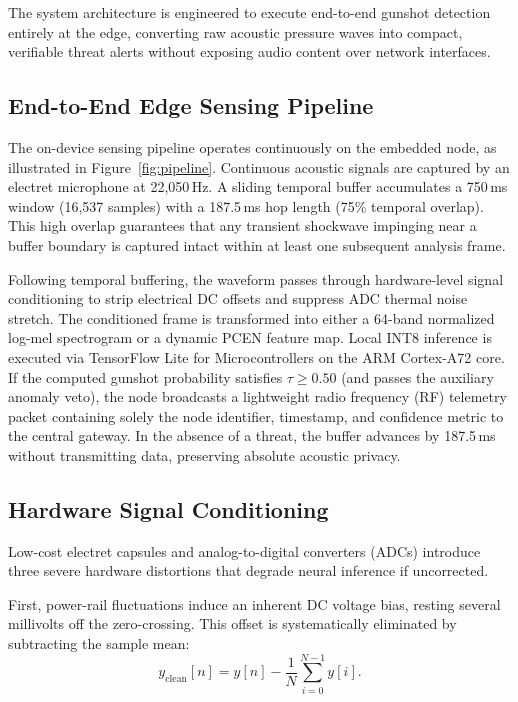 \documentclass[conference]{IEEEtran}
\begin{document}
The system architecture is engineered to execute end-to-end gunshot detection entirely at the edge, converting raw acoustic pressure waves into compact, verifiable threat alerts without exposing audio content over network interfaces.

\subsection{End-to-End Edge Sensing Pipeline}
\label{subsec:edge_pipeline}

The on-device sensing pipeline operates continuously on the embedded node, as illustrated in Figure~\ref{fig:pipeline}. Continuous acoustic signals are captured by an electret microphone at 22{,}050\,Hz. A sliding temporal buffer accumulates a 750\,ms window (16{,}537 samples) with a 187.5\,ms hop length (75\% temporal overlap). This high overlap guarantees that any transient shockwave impinging near a buffer boundary is captured intact within at least one subsequent analysis frame.

Following temporal buffering, the waveform passes through hardware-level signal conditioning to strip electrical DC offsets and suppress ADC thermal noise stretch. The conditioned frame is transformed into either a 64-band normalized log-mel spectrogram or a dynamic PCEN feature map. Local INT8 inference is executed via TensorFlow Lite for Microcontrollers on the ARM Cortex-A72 core. If the computed gunshot probability satisfies $\tau \ge 0.50$ (and passes the auxiliary anomaly veto), the node broadcasts a lightweight radio frequency (RF) telemetry packet containing solely the node identifier, timestamp, and confidence metric to the central gateway. In the absence of a threat, the buffer advances by 187.5\,ms without transmitting data, preserving absolute acoustic privacy.

\subsection{Hardware Signal Conditioning}
\label{subsec:conditioning}

Low-cost electret capsules and analog-to-digital converters (ADCs) introduce three severe hardware distortions that degrade neural inference if uncorrected.

First, power-rail fluctuations induce an inherent DC voltage bias, resting several millivolts off the zero-crossing. This offset is systematically eliminated by subtracting the sample mean:
\begin{equation}
    y_{\mathrm{clean}}[n] = y[n] - \frac{1}{N}\sum_{i=0}^{N-1} y[i].
    \label{eq:dc_strip}
\end{equation}
\end{document}
